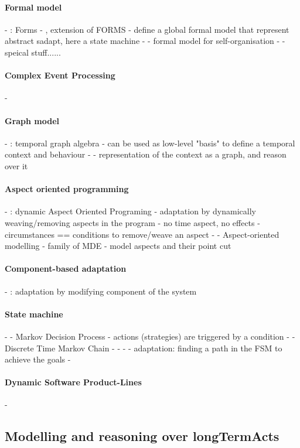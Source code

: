 \paragraph{Formal model}
- \cite{DBLP:journals/taas/WeynsMA12}: Forms
- \cite{DBLP:conf/icse/IftikharW14a}, extension of FORMS
	- define a global formal model that represent abstract \gls{sadapt}, here a state machine
- \cite{DBLP:journals/taas/WeynsHH10}
	- formal model for self-organisation
- \cite{DBLP:conf/icse/BartelsK11}
	- speical stuff......

\paragraph{Complex Event Processing}
- \cite{DBLP:conf/rr/AnicicFRSSS10}

\paragraph{Graph model}
- \cite{DBLP:conf/dbpl/MoffittS17}: temporal graph algebra
	- can be used as low-level "basis" to define a temporal context and behaviour
- \cite{DBLP:journals/tse/KramerM90}
	- representation of the context as a graph, and reason over it
	
\paragraph{Aspect oriented programming}
- \cite{DBLP:journals/taosd/GreenwoodB06, DBLP:conf/soco/DavidL06, DBLP:conf/icws/CharfiDM09, DBLP:journals/scp/ParraBCD11, DBLP:conf/ewsa/FalcarinA04, DBLP:conf/gpce/PintoFT03}: dynamic Aspect Oriented Programing
	- adaptation by dynamically weaving/removing aspects in the program
	- no time aspect, no effects
	- circumstances == conditions to remove/weave an aspect
- \cite{DBLP:conf/icse/MorinBNJ09}
	- Aspect-oriented modelling
	 - family of MDE
	- model aspects and their point cut

\paragraph{Component-based adaptation}
- \cite{DBLP:conf/soco/DavidL06}: adaptation by modifying component of the system

\paragraph{State machine}
- \cite{DBLP:conf/sigsoft/MorenoCGS15}
	- Markov Decision Process
	- actions (strategies) are triggered by a condition
- \cite{DBLP:conf/kbse/FilieriGLM11}
	- Discrete Time Markov Chain
- \cite{DBLP:conf/wetice/DjoudiBZ14}
- \cite{DBLP:conf/aosd/ZhangGC09}
- \cite{DBLP:conf/icse/GhezziPST13}
	- adaptation: finding a path in the FSM to achieve the goals
- \cite{DBLP:conf/kbse/TajalliGEM10}

\paragraph{Dynamic Software Product-Lines}
- \cite{DBLP:conf/dagstuhl/GhezziS10, DBLP:series/lncs/CordyCHLS13}


	


\subsection[Modelling and reasoning over long-term actions]{Modelling and reasoning over \glspl{longTermAct}}